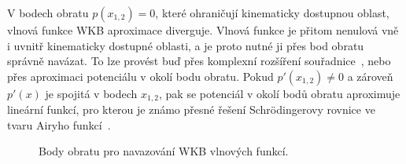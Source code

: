 V bodech obratu $p(x_{1,2})=0$, které ohraničují kinematicky dostupnou oblast, vlnová funkce WKB aproximace diverguje.
Vlnová funkce je přitom nenulová vně i uvnitř kinematicky dostupné oblasti, a je proto nutné ji přes bod obratu správně navázat.
To lze provést buď přes komplexní rozšíření souřadnice~\cite{Cejnar2013}, nebo přes aproximaci potenciálu v okolí bodu obratu. 
Pokud $p'(x_{1,2})\neq0$ a zároveň $p'(x)$ je spojitá v bodech $x_{1,2}$, pak se potenciál v okolí bodů obratu aproximuje lineární funkcí, pro kterou je známo přesné řešení Schrödingerovy rovnice ve tvaru Airyho funkcí~\cite{Formanek2004}.

\begin{figure}[!htbp]
    \begin{subfigure}{0.45\linewidth}
        \centering{}
    \end{subfigure}
    \hfill
    \begin{subfigure}{0.45\linewidth}
        \centering{}	
    \end{subfigure}
    \caption{
        Body obratu pro navazování WKB vlnových funkcí.
    }
\label{fig:WKBConnection}
\end{figure}				

